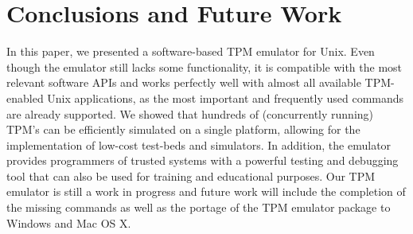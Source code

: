 \documentclass[11pt,letterpaper]{article}
\begin{document}
\section{Conclusions and Future Work}
In this paper, we presented a software-based TPM emulator for Unix. Even though the emulator still
lacks some functionality, it is compatible with the most relevant software APIs and works perfectly
well with almost all available TPM-enabled Unix applications, as the most important and frequently
used commands are already supported. We showed that hundreds of (concurrently running) TPM's can
be efficiently simulated on a single platform, allowing for the implementation of low-cost test-beds
and simulators. In addition, the emulator provides programmers of trusted systems with a powerful
testing and debugging tool that can also be used for training and educational purposes. Our TPM
emulator is still a work in progress and future work will include the completion of the missing
commands as well as the portage of the TPM emulator package to Windows and Mac OS X.



\end{document}
